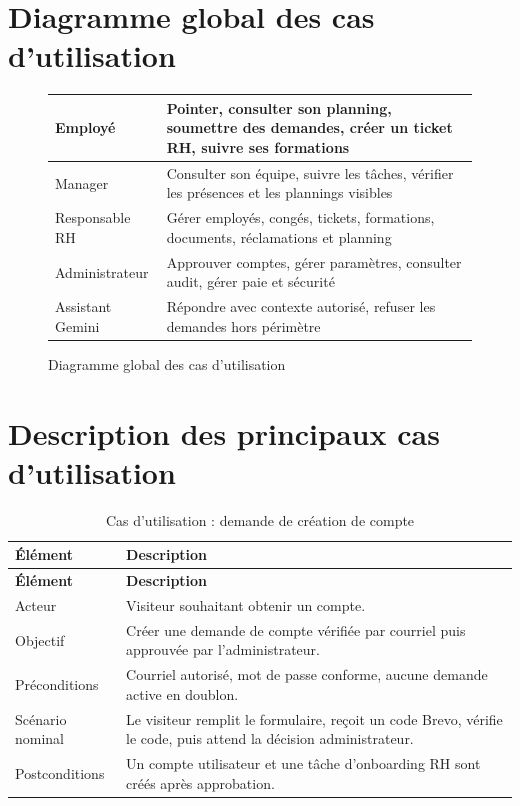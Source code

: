 \documentclass[12pt,a4paper]{report}
\begin{document}
\section{Diagramme global des cas d'utilisation}

\begin{figure}[h!]
\centering
\renewcommand{\arraystretch}{1.25}
\begin{tabular}{|>{\centering\arraybackslash}p{4cm}|>{\centering\arraybackslash}p{10cm}|}
\hline
Employé & Pointer, consulter son planning, soumettre des demandes, créer un ticket RH, suivre ses formations \\ \hline
Manager & Consulter son équipe, suivre les tâches, vérifier les présences et les plannings visibles \\ \hline
Responsable RH & Gérer employés, congés, tickets, formations, documents, réclamations et planning \\ \hline
Administrateur & Approuver comptes, gérer paramètres, consulter audit, gérer paie et sécurité \\ \hline
Assistant Gemini & Répondre avec contexte autorisé, refuser les demandes hors périmètre \\ \hline
\end{tabular}
\caption{Diagramme global des cas d'utilisation}
\label{fig:use-cases}
\end{figure}


\section{Description des principaux cas d'utilisation}

\begin{longtable}{>{\raggedright\arraybackslash}p{4cm}>{\raggedright\arraybackslash}p{10cm}}
\caption{Cas d'utilisation : demande de création de compte}\label{tab:cu-compte}\\
\toprule
\textbf{Élément} & \textbf{Description} \\
\midrule
\endfirsthead
\toprule
\textbf{Élément} & \textbf{Description} \\
\midrule
\endhead
Acteur & Visiteur souhaitant obtenir un compte. \\
Objectif & Créer une demande de compte vérifiée par courriel puis approuvée par l'administrateur. \\
Préconditions & Courriel autorisé, mot de passe conforme, aucune demande active en doublon. \\
Scénario nominal & Le visiteur remplit le formulaire, reçoit un code Brevo, vérifie le code, puis attend la décision administrateur. \\
Postconditions & Un compte utilisateur et une tâche d'onboarding RH sont créés après approbation. \\
\bottomrule
\end{longtable}
\end{document}
